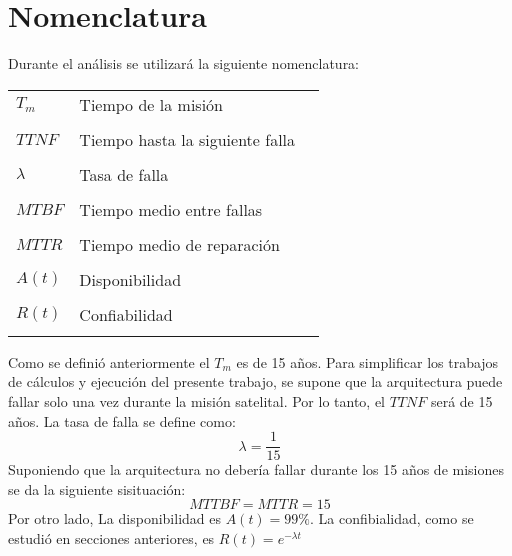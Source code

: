 \section{Nomenclatura}
Durante el análisis se utilizará la siguiente nomenclatura:

\begin{tabular}{p{3cm}l l }

$T_m$       & Tiempo de la misión\\ \\
$TTNF$      & Tiempo hasta la siguiente falla\\ \\
$\lambda$   & Tasa de falla\\ \\
$MTBF$      & Tiempo medio entre fallas\\ \\
$MTTR$      & Tiempo medio de reparación\\ \\
$A(t)$      & Disponibilidad\\ \\
$R(t)$      & Confiabilidad\\ \\

\end{tabular}

Como se definió anteriormente el $T_m$ es de 15 años. Para simplificar los trabajos de cálculos y ejecución del presente trabajo, se supone que la arquitectura puede fallar solo una vez durante la misión satelital. Por lo tanto, el $TTNF$ será de 15 años. La tasa de falla se define como: $$\lambda = \frac{1}{15}$$ Suponiendo que la arquitectura no debería fallar durante los 15 años de misiones se da la siguiente sisituación: $$MTTBF = MTTR = 15 $$ Por otro lado, La disponibilidad es $A(t) = 99\%$. La confibialidad, como se estudió en secciones anteriores, es $R(t) = e^{- \lambda t}$


